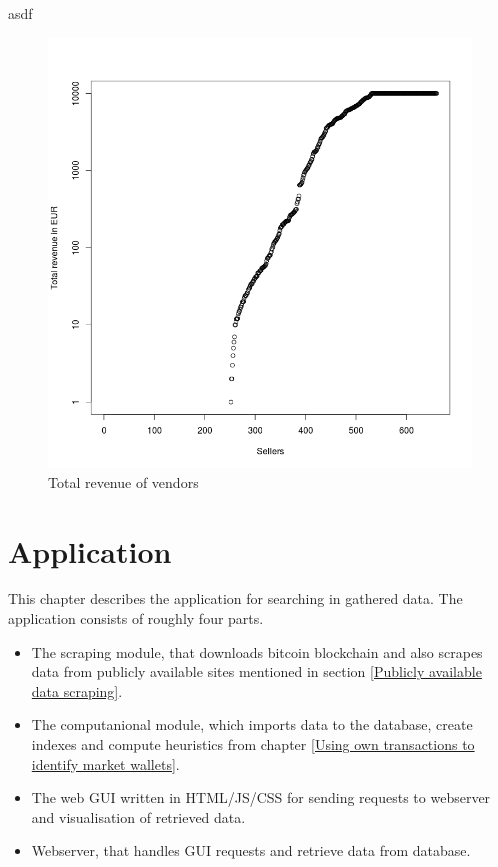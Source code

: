 \documentclass[
  digital, %
  table,   %
  lof,     %
  lot,     %
  oneside
]{fithesis3}
\begin{document}
asdf
\begin{figure}[!htb]
    \centering
    \includegraphics[scale=0.4]{total-rev}
    \caption{Total revenue of vendors}
    \label{Vendors by total revenue}
\end{figure}



\chapter{Application}

This chapter describes the application for searching in gathered data.
The application consists of roughly four parts.

\begin{itemize}
 \item The scraping module, that downloads bitcoin blockchain and also scrapes data from publicly available sites mentioned in section \ref{Publicly available data scraping}.
 \item The computanional module, which imports data to the database, create indexes and compute heuristics from chapter \ref{Using own transactions to identify market wallets}.
 \item The web GUI written in HTML/JS/CSS for sending requests to webserver and visualisation of retrieved data. 
 \item Webserver, that handles GUI requests and retrieve data from database.
\end{itemize}
\end{document}
